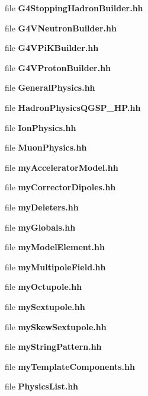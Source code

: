 \begin{CompactItemize}
\item 
file {\bf G4StoppingHadronBuilder.hh}
\item 
file {\bf G4VNeutronBuilder.hh}
\item 
file {\bf G4VPiKBuilder.hh}
\item 
file {\bf G4VProtonBuilder.hh}
\item 
file {\bf GeneralPhysics.hh}
\item 
file {\bf HadronPhysicsQGSP_HP.hh}
\item 
file {\bf IonPhysics.hh}
\item 
file {\bf MuonPhysics.hh}
\item 
file {\bf myAcceleratorModel.hh}
\item 
file {\bf myCorrectorDipoles.hh}
\item 
file {\bf myDeleters.hh}
\item 
file {\bf myGlobals.hh}
\item 
file {\bf myModelElement.hh}
\item 
file {\bf myMultipoleField.hh}
\item 
file {\bf myOctupole.hh}
\item 
file {\bf mySextupole.hh}
\item 
file {\bf mySkewSextupole.hh}
\item 
file {\bf myStringPattern.hh}
\item 
file {\bf myTemplateComponents.hh}
\item 
file {\bf PhysicsList.hh}
\end{CompactItemize}

